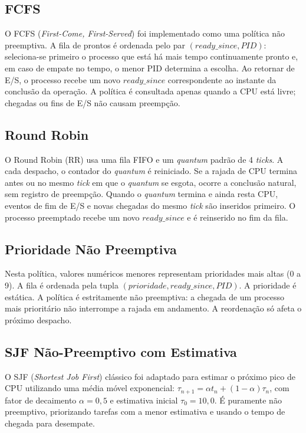 \documentclass[conference]{IEEEtran}
\begin{document}
\subsection{FCFS}
O FCFS (\textit{First-Come, First-Served}) foi implementado como uma política não preemptiva. A fila de prontos é ordenada pelo par $(ready\_since, PID)$: seleciona-se primeiro o processo que está há mais tempo continuamente pronto e, em caso de empate no tempo, o menor PID determina a escolha. Ao retornar de E/S, o processo recebe um novo $ready\_since$ correspondente ao instante da conclusão da operação. A política é consultada apenas quando a CPU está livre; chegadas ou fins de E/S não causam preempção.

\subsection{Round Robin}
O Round Robin (RR) usa uma fila FIFO e um \textit{quantum} padrão de 4 \textit{ticks}. A cada despacho, o contador do \textit{quantum} é reiniciado. Se a rajada de CPU termina antes ou no mesmo \textit{tick} em que o \textit{quantum} se esgota, ocorre a conclusão natural, sem registro de preempção. Quando o \textit{quantum} termina e ainda resta CPU, eventos de fim de E/S e novas chegadas do mesmo \textit{tick} são inseridos primeiro. O processo preemptado recebe um novo $ready\_since$ e é reinserido no fim da fila.

\subsection{Prioridade Não Preemptiva}
Nesta política, valores numéricos menores representam prioridades mais altas (0 a 9). A fila é ordenada pela tupla $(prioridade, ready\_since, PID)$. A prioridade é estática. A política é estritamente não preemptiva: a chegada de um processo mais prioritário não interrompe a rajada em andamento. A reordenação só afeta o próximo despacho.

\subsection{SJF Não-Preemptivo com Estimativa}
O SJF (\textit{Shortest Job First}) clássico foi adaptado para estimar o próximo pico de CPU utilizando uma média móvel exponencial: $\tau_{n+1} = \alpha t_n + (1 - \alpha) \tau_n$, com fator de decaimento $\alpha = 0,5$ e estimativa inicial $\tau_0 = 10,0$. É puramente não preemptivo, priorizando tarefas com a menor estimativa e usando o tempo de chegada para desempate.
\end{document}
